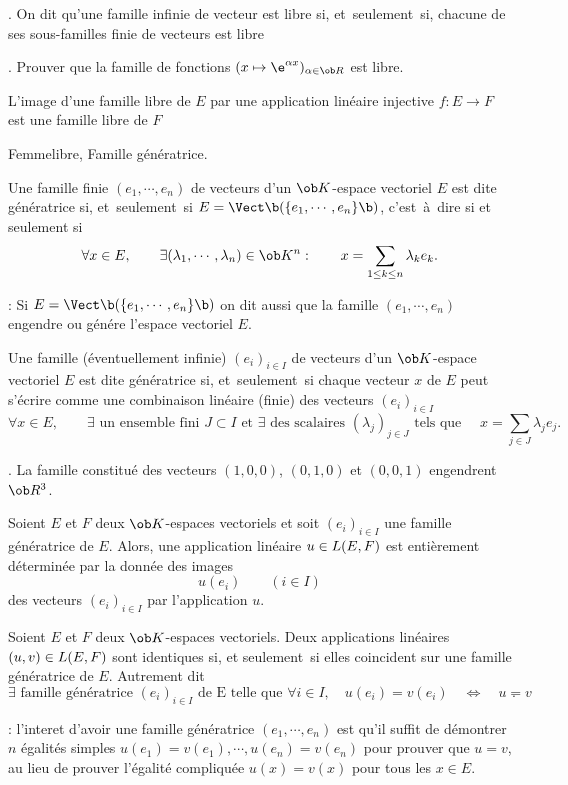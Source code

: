 \Remarque. On dit qu'une famille infinie de vecteur est libre si, et~seulement~si, chacune de ses sous-familles finie de vecteurs est libre
\bigskip

\Exercice. Prouver que la famille de fonctions $(x\mapsto\e^{\alpha x})_{\alpha\in\ob R}$ est libre. 
\bigskip

\Propriete L'image d'une famille libre de $E$ par une application linéaire injective $f:E\to F$ est une
famille libre de $F$

\Subsection Femmelibre, Famille génératrice. 
\bigskip

\Definition []  Une famille finie $(e_1,\cdots,e_n)$ de vecteurs d'un $\ob K$-espace vectoriel $E$ est dite 
génératrice si, et~seulement~si $E=\Vect\b(\{e_1,\cdots,e_n\}\b)$, c'est~à~dire si et seulement si
$$
\forall x\in E , \qquad  \exists (\lambda_1,\cdots, \lambda_n)\in\ob K^n :\qquad {x=\sum_{1\le k\le n}\lambda_ke_k}.
$$

\Remarque : Si $E=\Vect\b(\{e_1,\cdots,e_n\}\b)$ on dit aussi que la famille $(e_1,\cdots,e_n)$ engendre ou génére l'espace vectoriel $E$. 
\bigskip

\Definition []  Une famille (éventuellement infinie) $(e_i)_{i\in I}$ de vecteurs d'un $\ob K$-espace vectoriel $E$ 
est dite génératrice si, et~seulement~si chaque vecteur $x$ de $E$ peut s'écrire comme une combinaison 
linéaire (finie) des vecteurs $(e_i)_{i\in I}$ 
$$
\forall x\in E, \qquad \exists \mbox{ un ensemble fini $J\subset I$ et }
\exists \mbox{ des scalaires $(\lambda_j)_{j\in J}$ tels que }\quad
x=\sum_{j\in J}\lambda_je_j. 
$$

\Exemple. La famille constitué des vecteurs $(1,0,0)$, $(0,1,0)$ et $(0,0,1)$ engendrent $\ob R^3$. 
\bigskip

\Propriete []  Soient $E$ et $F$ deux $\ob K$-espaces vectoriels et soit $(e_i)_{i\in I}$ une famille génératrice de $E$. 
Alors, une application linéaire $u\in\sc L(E,F)$ est entièrement déterminée 
par la donnée des images 
$$
u(e_i)\qquad(i\in I)
$$ 
des vecteurs $(e_i)_{i\in I}$ par l'application $u$. 
\bigskip

\Propriete []  Soient $E$ et $F$ deux $\ob K$-espaces vectoriels. Deux applications linéaires $(u,v)\in\sc L(E,F)$ 
sont identiques si, et seulement~si elles coincident sur une famille génératrice de $E$. Autrement dit
$$
{\exists \mbox{ famille génératrice }(e_i)_{i\in I}\mbox{ de E telle que }\forall i\in I, \quad u(e_i)=v(e_i)\quad\Longleftrightarrow \quad u=v}.
$$

\Remarque : l'interet d'avoir une famille génératrice $(e_1,\cdots,e_n)$ est qu'il suffit 
de démontrer $n$ égalités simples $u(e_1)=v(e_1),\cdots, u(e_n)=v(e_n)$ pour prouver que $u=v$, au lieu de prouver l'égalité compliquée $u(x)=v(x)$ pour tous les $x\in E$. 
\bigskip


